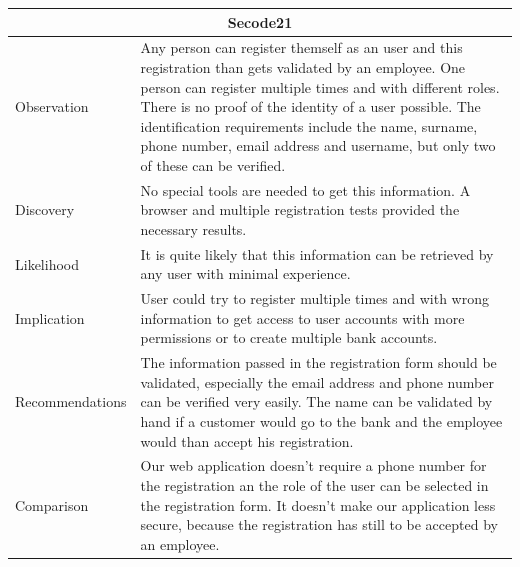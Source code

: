 \documentclass[headsepline,footsepline,footinclude=false,oneside,fontsize=11pt,paper=a4,listof=totoc,bibliography=totoc]{scrbook} %
\begin{document}
\begin{tabular}{ l|p{11cm}  }
	\hline
	\multicolumn{2}{c}{\textbf{Secode21}} \\
	\hline
	Observation   & Any person can register themself as an user and this registration than gets validated by an employee. One person can register multiple times and with different roles. There is no proof of the identity of a user possible. The identification requirements include the name, surname, phone number, email address and username, but only two of these can be verified. \\
	Discovery  & No special tools are needed to get this information. A browser and multiple registration tests provided the necessary results. \\
	Likelihood & It is quite likely that this information can be retrieved by any user with minimal experience. \\
	Implication    & User could try to register multiple times and with wrong information to get access to user accounts with more permissions or to create multiple bank accounts. \\
	Recommendations & The information passed in the registration form should be validated, especially the email address and phone number can be verified very easily. The name can be validated by hand if a customer would go to the bank and the employee would than accept his registration. \\
	Comparison & Our web application doesn't require a phone number for the registration an the role of the user can be selected in the registration form. It doesn't make our application less secure, because the registration has still to be accepted by an employee. \\
	\hline
\end{tabular}
\\
\vspace{0.5cm}
\\
\end{document}

